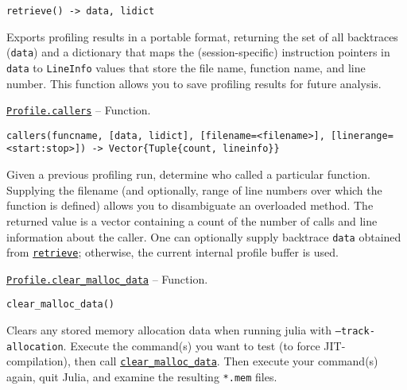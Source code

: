 \begin{adjustwidth}{2em}{0pt}


\begin{verbatim}
retrieve() -> data, lidict
\end{verbatim}

{\textquotedbl}Exports{\textquotedbl} profiling results in a portable format, returning the set of all backtraces (\texttt{data}) and a dictionary that maps the (session-specific) instruction pointers in \texttt{data} to \texttt{LineInfo} values that store the file name, function name, and line number. This function allows you to save profiling results for future analysis.



\end{adjustwidth}
\hypertarget{14497996294492518181}{}
\hyperlink{14497996294492518181}{\texttt{Profile.callers}}  -- {Function.}

\begin{adjustwidth}{2em}{0pt}


\begin{verbatim}
callers(funcname, [data, lidict], [filename=<filename>], [linerange=<start:stop>]) -> Vector{Tuple{count, lineinfo}}
\end{verbatim}

Given a previous profiling run, determine who called a particular function. Supplying the filename (and optionally, range of line numbers over which the function is defined) allows you to disambiguate an overloaded method. The returned value is a vector containing a count of the number of calls and line information about the caller. One can optionally supply backtrace \texttt{data} obtained from \hyperlink{10202508103131430980}{\texttt{retrieve}}; otherwise, the current internal profile buffer is used.



\end{adjustwidth}
\hypertarget{12697816172521511938}{}
\hyperlink{12697816172521511938}{\texttt{Profile.clear\_malloc\_data}}  -- {Function.}

\begin{adjustwidth}{2em}{0pt}


\begin{verbatim}
clear_malloc_data()
\end{verbatim}

Clears any stored memory allocation data when running julia with \texttt{--track-allocation}. Execute the command(s) you want to test (to force JIT-compilation), then call \hyperlink{12697816172521511938}{\texttt{clear\_malloc\_data}}. Then execute your command(s) again, quit Julia, and examine the resulting \texttt{*.mem} files.



\end{adjustwidth}

